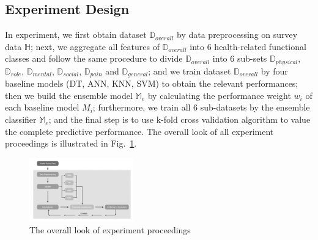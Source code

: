 \documentclass[10pt,journal,compsoc]{IEEEtran}
\begin{document}
\subsection{Experiment Design}
In experiment, we first obtain dataset $\mathbb{D}_{overall}$ by data preprocessing on survey data $\mathbb{H}$; next, we aggregate all features of $\mathbb{D}_{overall}$ into 6 health-related functional classes and follow the same procedure to divide $\mathbb{D}_{overall}$ into 6 sub-sets $\mathbb{D}_{physical}$, $\mathbb{D}_{role}$, $\mathbb{D}_{mental}$, $\mathbb{D}_{social}$, $\mathbb{D}_{pain}$ and $\mathbb{D}_{general}$; and we train dataset $\mathbb{D}_{overall}$ by four baseline models (DT, ANN, KNN, SVM) to obtain the relevant performances; then we build the ensemble model $\mathbb{M}_{e}$ by calculating the performance weight $w_{i}$ of each baseline model $M_{i} $; furthermore, we train all 6 sub-datasets by the ensemble classifier $\mathbb{M}_{e}$; and the final step is to use k-fold cross validation algorithm to value the complete predictive performance. The overall look of all experiment proceedings is illustrated in Fig.~\ref{fig4}. 
\begin{figure}[h]
\includegraphics[width=0.4\textwidth]{experiment.png}
\centering
\captionsetup{justification=centering}
\caption{The overall look of experiment proceedings} \label{fig4}
\end{figure}
\end{document}
